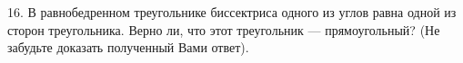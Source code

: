 16. В равнобедренном треугольнике биссектриса одного из углов равна одной из сторон треугольника. Верно ли, что этот треугольник --- прямоугольный? (Не забудьте доказать полученный Вами ответ).\\
